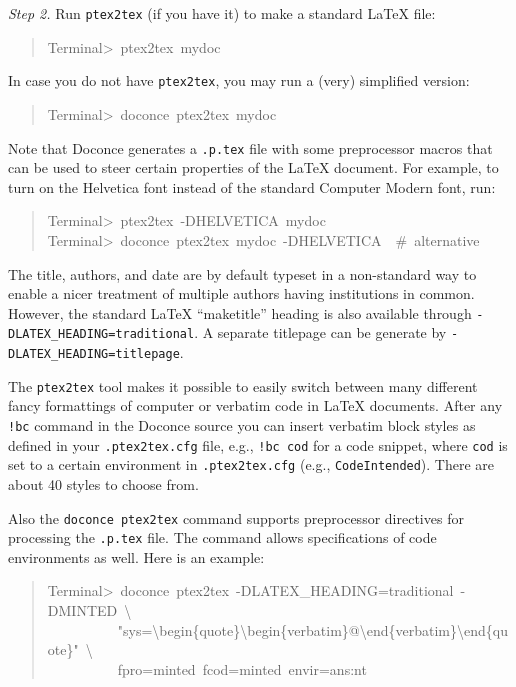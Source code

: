 \documentclass[a4paper]{article}
\begin{document}
\emph{Step 2.} Run \texttt{ptex2tex} (if you have it) to make a standard LaTeX file:
%
\begin{quote}{\ttfamily \raggedright \noindent
Terminal>~ptex2tex~mydoc
}
\end{quote}

In case you do not have \texttt{ptex2tex}, you may run a (very) simplified version:
%
\begin{quote}{\ttfamily \raggedright \noindent
Terminal>~doconce~ptex2tex~mydoc
}
\end{quote}

Note that Doconce generates a \texttt{.p.tex} file with some preprocessor macros
that can be used to steer certain properties of the LaTeX document.
For example, to turn on the Helvetica font instead of the standard
Computer Modern font, run:
%
\begin{quote}{\ttfamily \raggedright \noindent
Terminal>~ptex2tex~-DHELVETICA~mydoc\\
Terminal>~doconce~ptex2tex~mydoc~-DHELVETICA~~\#~alternative
}
\end{quote}

The title, authors, and date are by default typeset in a non-standard
way to enable a nicer treatment of multiple authors having
institutions in common. However, the standard LaTeX ``maketitle'' heading
is also available through \texttt{-DLATEX\_HEADING=traditional}.
A separate titlepage can be generate by
\texttt{-DLATEX\_HEADING=titlepage}.

The \texttt{ptex2tex} tool makes it possible to easily switch between many
different fancy formattings of computer or verbatim code in LaTeX
documents. After any \texttt{!bc} command in the Doconce source you can
insert verbatim block styles as defined in your \texttt{.ptex2tex.cfg}
file, e.g., \texttt{!bc cod} for a code snippet, where \texttt{cod} is set to
a certain environment in \texttt{.ptex2tex.cfg} (e.g., \texttt{CodeIntended}).
There are about 40 styles to choose from.

Also the \texttt{doconce ptex2tex} command supports preprocessor directives
for processing the \texttt{.p.tex} file. The command allows specifications
of code environments as well. Here is an example:
%
\begin{quote}{\ttfamily \raggedright \noindent
Terminal>~doconce~ptex2tex~-DLATEX\_HEADING=traditional~-DMINTED~\textbackslash{}\\
~~~~~~~~~~"sys=\textbackslash{}begin\{quote\}\textbackslash{}begin\{verbatim\}@\textbackslash{}end\{verbatim\}\textbackslash{}end\{quote\}"~\textbackslash{}\\
~~~~~~~~~~fpro=minted~fcod=minted~envir=ans:nt
}
\end{quote}
\end{document}
